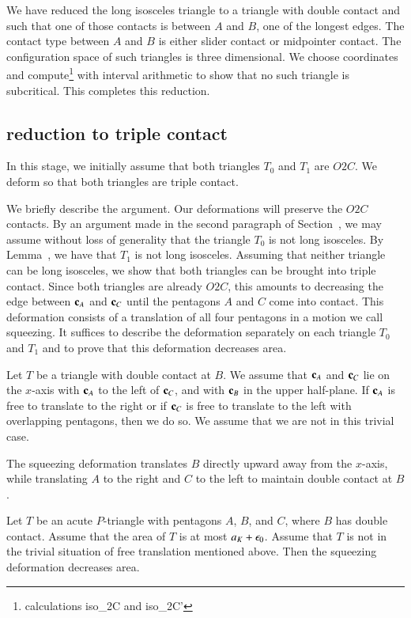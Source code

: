 We have reduced the long isosceles triangle to a triangle with double contact and such that one of those contacts is between $A$ and $B$, one of the
longest edges.  The contact type between $A$ and $B$ is either slider contact or midpointer contact.  The configuration space of such triangles is
three dimensional.  We choose coordinates and compute\footnote{calculations iso\_2C and iso\_2C'} 
with interval arithmetic to show that no such triangle is subcritical.  This completes this reduction.

\subsection{reduction to triple contact}

In this stage, we initially assume that both triangles $T_0$ and $T_1$ are $O2C$.
We deform so that both triangles are triple contact.

We briefly describe the argument.   Our deformations will preserve the $O2C$ contacts.  By an argument made in the second paragraph of Section~,
we may assume without loss of generality that the triangle $T_0$ is not long isosceles.   By Lemma~, we have that $T_1$ is not long
isosceles.
Assuming that neither triangle can be long isosceles,
 we show that both triangles can be brought into triple contact.  Since both triangles are already $O2C$, this amounts
to decreasing the edge between ${\mathbf c}_A$ and ${\mathbf c}_C$ until the pentagons $A$ and $C$ come into contact.
This deformation consists of a translation of all four pentagons in a motion we call squeezing.  It suffices to describe the deformation separately on
each triangle $T_0$ and $T_1$ and to prove that this deformation decreases area.  

Let $T$ be a triangle with double contact at $B$.  We assume that ${\mathbf c}_A$ and ${\mathbf c}_C$ lie on the $x$-axis with ${\mathbf c}_A$ to the left of ${\mathbf c}_C$, and
with ${\mathbf c}_B$ in the upper half-plane.
If ${\mathbf c}_A$ is free to translate to the right or if ${\mathbf c}_C$ is free to translate to the left with overlapping pentagons, then we do so.  We assume that
we are not in this trivial case.

The squeezing deformation translates $B$ directly upward away from the $x$-axis, while translating $A$ to the right and $C$ to the left to maintain
double contact at $B$.  

\begin{lemma}  Let $T$ be an acute $P$-triangle with pentagons $A$, $B$, and $C$, where $B$ has double contact.
Assume that the  area of $T$ is at most $a_K+\epsilon_0$.  Assume that $T$ is not in the trivial situation of free translation mentioned above.
Then the squeezing deformation decreases area.
\end{lemma}

